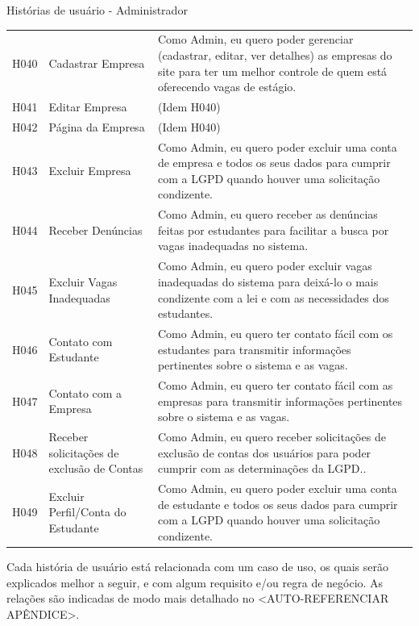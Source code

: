 \begin{quadro}[H]
	\centering
	\ABNTEXfontereduzida
	\caption{Histórias de usuário - Administrador}
	\label{user-story-admin}
	\begin{tabular}{|l|p{4 cm}|p{9 cm}|}
		\hline 
		\thead{Código} & \thead[l]{Nome} & \thead[l]{Descrição} \\
		\hline
		H040 & Cadastrar Empresa & Como Admin, eu quero poder gerenciar (cadastrar, editar, ver detalhes) as empresas do site para ter um melhor controle de quem está oferecendo vagas de estágio. \\
		\hline
		H041 & Editar Empresa & (Idem H040) \\
		\hline
		H042 & Página da Empresa & (Idem H040) \\
		\hline
		H043 & Excluir Empresa & Como Admin, eu quero poder excluir uma conta de empresa e todos os seus dados para cumprir com a LGPD quando houver uma solicitação condizente. \\
		\hline
		H044 & Receber Denúncias & Como Admin, eu quero receber as denúncias feitas por estudantes para facilitar a busca por vagas inadequadas no sistema. \\
		\hline
		H045 & Excluir Vagas Inadequadas & Como Admin, eu quero poder excluir vagas inadequadas do sistema para deixá-lo o mais condizente com a lei e com as necessidades dos estudantes. \\
		\hline
		H046 & Contato com Estudante & Como Admin, eu quero ter contato fácil com os estudantes para transmitir informações pertinentes sobre o sistema e as vagas. \\
		\hline
		H047 & Contato com a Empresa & Como Admin, eu quero ter contato fácil com as empresas para transmitir informações pertinentes sobre o sistema e as vagas. \\
		\hline
		H048 & Receber solicitações de exclusão de Contas & Como Admin, eu quero receber solicitações de exclusão de contas dos usuários para poder cumprir com as determinações da LGPD.. \\
		\hline
		H049 & Excluir Perfil/Conta do Estudante & Como Admin, eu quero poder excluir uma conta de estudante e todos os seus dados para cumprir com a LGPD quando houver uma solicitação condizente. \\
		\hline
	\end{tabular}
\end{quadro}

Cada história de usuário está relacionada com um caso de uso, os quais serão explicados melhor a seguir, e com algum requisito e/ou regra de negócio. As relações são indicadas de modo mais detalhado no <AUTO-REFERENCIAR APÊNDICE>.

